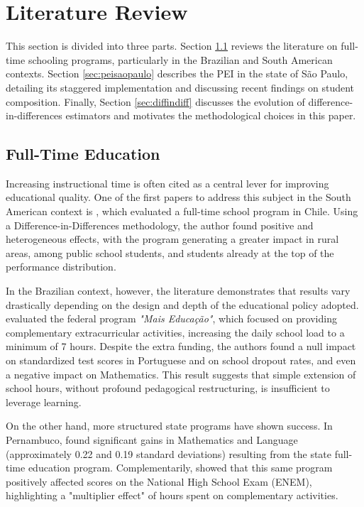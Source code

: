 ﻿\section{Literature Review} \label{sec:literature}

This section is divided into three parts. Section \ref{sec:ensinointegral} reviews the literature on full-time schooling programs, particularly in the Brazilian and South American contexts. Section \ref{sec:peisaopaulo} describes the PEI in the state of São Paulo, detailing its staggered implementation and discussing recent findings on student composition. Finally, Section \ref{sec:diffindiff} discusses the evolution of difference-in-differences estimators and motivates the methodological choices in this paper.

\subsection{Full-Time Education} \label{sec:ensinointegral}

Increasing instructional time is often cited as a central lever for improving educational quality. One of the first papers to address this subject in the South American context is \textcite{bellei2009}, which evaluated a full-time school program in Chile. Using a Difference-in-Differences methodology, the author found positive and heterogeneous effects, with the program generating a greater impact in rural areas, among public school students, and students already at the top of the performance distribution.

In the Brazilian context, however, the literature demonstrates that results vary drastically depending on the design and depth of the educational policy adopted. \textcite{AlmeidaEtAl2016MaisEducacao} evaluated the federal program \textit{"Mais Educação"}, which focused on providing complementary extracurricular activities, increasing the daily school load to a minimum of 7 hours. Despite the extra funding, the authors found a null impact on standardized test scores in Portuguese and on school dropout rates, and even a negative impact on Mathematics. This result suggests that simple extension of school hours, without profound pedagogical restructuring, is insufficient to leverage learning.

On the other hand, more structured state programs have shown success. In Pernambuco, \textcite{Pernambuco} found significant gains in Mathematics and Language (approximately 0.22 and 0.19 standard deviations) resulting from the state full-time education program. Complementarily, \textcite{araujo2020_pernambuco_impacto_enem} showed that this same program positively affected scores on the National High School Exam (ENEM), highlighting a "multiplier effect" of hours spent on complementary activities.

